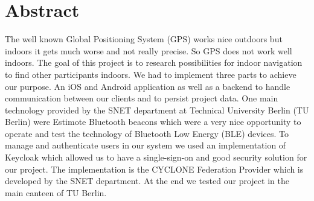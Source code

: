 \chapter*{Abstract}
\label{cha:abstract}

The well known Global Positioning System (GPS) works nice outdoors but indoors it gets much worse and not really precise. So GPS does not work well indoors. The goal of this project is to research possibilities for indoor navigation to find other participants indoors. We had to implement three parts to achieve our purpose. An iOS and Android application as well as a backend to handle communication between our clients and to persist project data. One main technology provided by the SNET department at Technical University Berlin (TU Berlin) were Estimote Bluetooth beacons which were a very nice opportunity to operate and test the technology of Bluetooth Low Energy (BLE) devices. To manage and authenticate users in our system we used an implementation of Keycloak which allowed us to have a single-sign-on and good security solution for our project. The implementation is the CYCLONE Federation Provider which is developed by the SNET department. At the end we tested our project in the main canteen of TU Berlin.